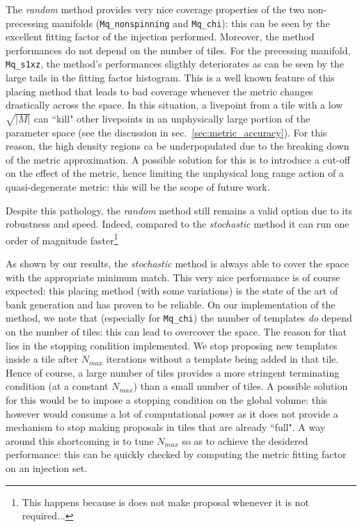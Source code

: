 \documentclass[twocolumn,showpacs,preprintnumbers,nofootinbib,prd,
superscriptaddress,10pt]{revtex4-1}
\begin{document}
The {\it random} method provides very nice coverage properties of the two non-precessing manifolds (\texttt{Mq\_nonspinning} and \texttt{Mq\_chi}): this can be seen by the excellent fitting factor of the injection performed. Moreover, the method performances do not depend on the number of tiles.
For the precessing manifold, \texttt{Mq\_s1xz}, the method's performances sligthly deteriorates as can be seen by the large tails in the fitting factor histogram.
This is a well known feature of this placing method that leads to bad coverage whenever the metric changes drastically across the space. In this situation, a livepoint from a tile with a low $\sqrt{|M|}$ can ``kill" other livepoints in an unphysically large portion of the parameter space (see the discussion in sec.~\ref{sec:metric_accuracy}). For this reason, the high density regions ca be underpopulated due to the breaking down of the metric approximation. A possible solution for this is to introduce a cut-off on the effect of the metric, hence limiting the unphysical long range action of a quasi-degenerate metric: this will be the scope of future work.

Despite this pathology, the {\it random} method still remains a valid option due to its robustness and speed. Indeed, compared to the {\it stochastic} method it can run one order of magnitude faster\footnote{This happens because is does not make proposal whenever it is not required...}

As shown by our results, the {\it stochastic} method is always able to cover the space with the appropriate minimum match. This very nice performance is of course expected: this placing method (with some variations) is the state of the art of bank generation and has proven to be reliable.
On our implementation of the method, we note that (especially for \texttt{Mq\_chi}) the number of templates {\it do} depend on the number of tiles: this can lead to overcover the space. The reason for that lies in the stopping condition implemented. We stop proposing new templates inside a tile after $N_{max}$ iterations without a template being added in that tile. Hence of course, a large number of tiles provides a more stringent terminating condition (at a constant $N_{max}$) than a small number of tiles.
A possible solution for this would be to impose a stopping condition on the global volume: this however would consume a lot of computational power as it does not provide a mechanism to stop making proposals in tiles that are already ``full".
A way around this shortcoming is to tune $N_{max}$ so as to achieve the desidered performance: this can be quickly checked by computing the metric fitting factor on an injection set.
\end{document}

